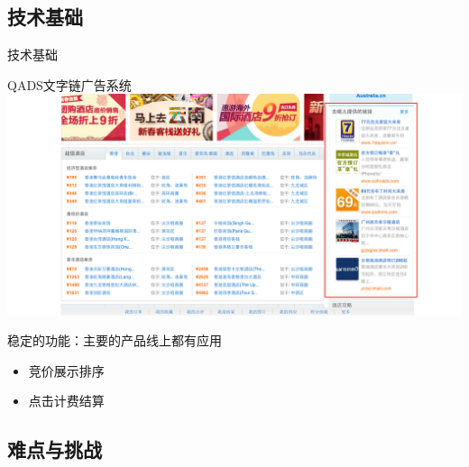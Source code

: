 \documentclass{beamer}
\begin{document}
\begin{CJK}{UTF8}{gbsn}
\subsection{技术基础}

\begin{frame}{技术基础}
\begin{block}{QADS文字链广告系统}
  \includegraphics[scale=0.23]{./imgs/qads-demo}
  \pause
\end{block}
\begin{block}{稳定的功能：主要的产品线上都有应用}
  \begin{itemize}
    \item {
      竞价展示排序 
    }
    \item {
      点击计费结算 
    }
  \end{itemize}
\end{block}
\end{frame}

\subsection{难点与挑战}


\end{CJK}
\end{document}
